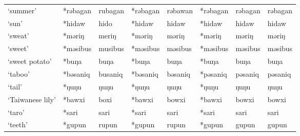 \begin{landscape}
\begin{longtable}[c]{@{}p{3cm}<{\raggedright}p{2.75cm}<{\raggedright}p{2.75cm}<{\raggedright}p{2.75cm}<{\raggedright}p{2.75cm}<{\raggedright}p{2.75cm}<{\raggedright}p{2.75cm}<{\raggedright}p{2.75cm}<{\raggedright}@{}}
`summer'                                             & *rəbagan           & rubagan                        & *rəbagan           & rəbawan                    & *rəbagan         & rəbagan                  & rəbagan                           \\
`sun'                                                & *hidaw             & hido                           & *hidaw             & hidaw                      & *hidaw           & hidaw                    & hidaw                             \\
`sweat'                                              & *məriŋ             & meriŋ                          & *məriŋ             & məriŋ                      & *məriŋ           & məriŋ                    & məriŋ                             \\
`sweet'                                              & *məsibus           & musibus                        & *məsibus           & məsibus                    & *məsibus         & məsibus                  & məsibus                           \\
`sweet potato'                                       & *buŋa              & buŋa                           & *buŋa              & buŋa                       & *buŋa            & buŋa                     & buŋa                              \\
`taboo'                                              & *bəsaniq           & busaniq                        & *bəsaniq           & bəsaniq                    & *pəsaniq         & pəsaniq                  & pəsaniq                           \\
`tail'                                               & *ŋuŋu              & ŋuŋu                           & *ŋuŋu              & ŋuŋu                       & *ŋuŋu            & ŋuŋu                     & ŋuŋu                              \\
`Taiwanese lily'                                     & *bawxi             & boxi                           & *bawxi             & bowxi                      & *bawxi           & bowxi                    & bowxi                             \\
`taro'                                               & *sari              & sari                           & *sari              & sari                       & *sari            & sari                     & sari                              \\
`teeth'                                              & *gupun             & rupun                          & *gupun             & rupun                      & *gupun           & gupun                    & gupun                             \\

\end{longtable}
\end{landscape}
